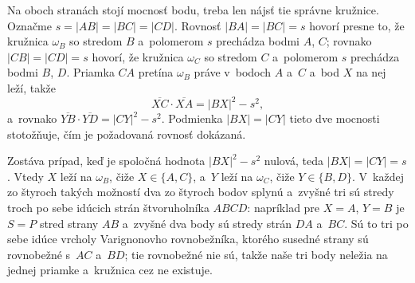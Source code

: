 {    Na oboch stranách stojí mocnosť bodu, treba len nájsť tie správne kružnice. Označme $s = |AB| = |BC| = |CD|$. Rovnosť $|BA| = |BC| = s$ hovorí presne to, že kružnica $\omega_B$ so stredom $B$ a~polomerom $s$ prechádza bodmi $A$, $C$; rovnako $|CB| = |CD| = s$ hovorí, že kružnica $\omega_C$ so stredom $C$ a~polomerom $s$ prechádza bodmi $B$, $D$. Priamka $CA$ pretína $\omega_B$ práve v~bodoch $A$ a~$C$ a~bod $X$ na nej leží, takže
    $$
    \overline{XC} \cdot \overline{XA} = |BX|^2 - s^2,
    $$
    a~rovnako $\overline{YB} \cdot \overline{YD} = |CY|^2 - s^2$. Podmienka $|BX| = |CY|$ tieto dve mocnosti stotožňuje, čím je požadovaná rovnosť dokázaná.

    Zostáva prípad, keď je spoločná hodnota $|BX|^2 - s^2$ nulová, teda $|BX| = |CY| = s$. Vtedy $X$ leží na $\omega_B$, čiže $X \in \{A, C\}$, a~$Y$ leží na $\omega_C$, čiže $Y \in \{B, D\}$. V~každej zo štyroch takých možností dva zo štyroch bodov splynú a~zvyšné tri sú stredy troch po sebe idúcich strán štvoruholníka $ABCD$: napríklad pre $X = A$, $Y = B$ je $S = P$ stred strany $AB$ a~zvyšné dva body sú stredy strán $DA$ a~$BC$. Sú to tri po sebe idúce vrcholy Varignonovho rovnobežníka, ktorého susedné strany sú rovnobežné s~$AC$ a~$BD$; tie rovnobežné nie sú, takže naše tri body neležia na jednej priamke a~kružnica cez ne existuje.
}

